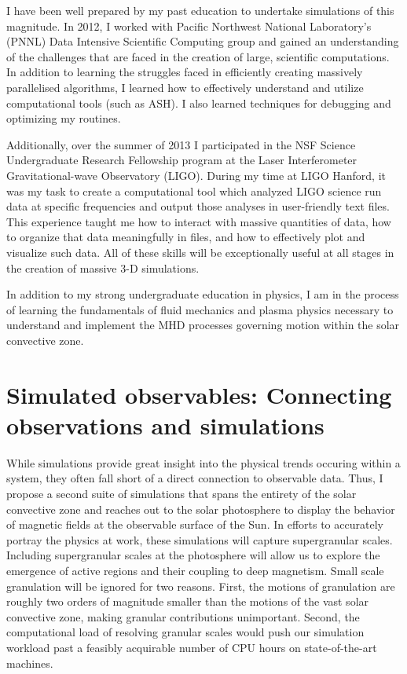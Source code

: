 \documentclass[aasms,12pt]{article}
\begin{document}
I have been well prepared by my past education to undertake
simulations of this magnitude.  
In 2012, I worked with
Pacific Northwest National Laboratory's (PNNL) Data Intensive Scientific
Computing group and gained an understanding of the challenges that are
faced in the
creation of large, scientific computations.  In addition to learning the
struggles faced in efficiently creating massively parallelised algorithms,
I learned how to effectively understand and utilize computational tools
(such as ASH). I also learned
techniques for debugging and optimizing my routines.

Additionally, over the summer of 2013 I participated in the NSF Science
Undergraduate Research Fellowship program at the Laser Interferometer
Gravitational-wave Observatory (LIGO).  During my time at LIGO Hanford, it was
my task to create a computational tool which analyzed LIGO science run data at
specific frequencies and output those analyses
in user-friendly text files.  This experience taught me how to interact with
massive quantities of data, how to organize that data meaningfully in files,
and how to effectively plot and visualize such data.  All of these skills
will be exceptionally useful at all stages in the creation of 
massive 3-D simulations.

In addition to my strong undergraduate education in physics, I am in the process
of learning the fundamentals of fluid mechanics and plasma physics necessary to
understand and implement the MHD processes governing motion within the solar 
convective zone.

\section{Simulated observables: Connecting observations and simulations}
While simulations provide great insight into the
physical trends occuring within a system, they often fall short of a direct
connection to observable data.  Thus, I propose a second suite of simulations
that spans the entirety of the solar convective zone and reaches out to
the solar photosphere to display the behavior of magnetic fields
at the observable surface of the Sun.  In efforts to accurately portray the
physics at work, these simulations will capture supergranular 
scales.  
Including supergranular scales at the photosphere will allow us to explore the
emergence of active regions and their coupling to deep magnetism.
Small scale granulation will be ignored for two reasons.  
First, the motions of granulation are roughly two orders of magnitude
smaller than the motions of the vast solar convective zone, making granular
contributions unimportant.
Second, the computational load of resolving granular scales
would push our simulation workload past a feasibly acquirable number of CPU
hours on state-of-the-art machines.
\end{document}
